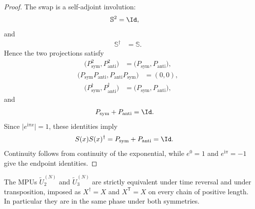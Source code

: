 \begin{proof}
    \leanok
    The swap is a self-adjoint involution:
    \begin{align}
        \mathbb S^2 & = \Id,
    \end{align}
    and
    \begin{align}
        \mathbb S^\dagger & = \mathbb S.
    \end{align}
    Hence the two projections satisfy
    \begin{align}
        \bigl(P_{\mathrm{sym}}^2,P_{\mathrm{anti}}^2\bigr)
         & = \bigl(P_{\mathrm{sym}},P_{\mathrm{anti}}\bigr),
    \end{align}
    \begin{align}
        \bigl(P_{\mathrm{sym}}P_{\mathrm{anti}},
        P_{\mathrm{anti}}P_{\mathrm{sym}}\bigr) & = (0,0),
    \end{align}
    \begin{align}
        \bigl(P_{\mathrm{sym}}^\dagger,P_{\mathrm{anti}}^\dagger\bigr)
         & = \bigl(P_{\mathrm{sym}},P_{\mathrm{anti}}\bigr),
    \end{align}
    and
    \begin{align}
        P_{\mathrm{sym}}+P_{\mathrm{anti}} & = \Id.
    \end{align}
    Since $\lvert e^{\mathrm{i}\pi x}\rvert=1$, these identities imply
    \begin{align}
        S(x)S(x)^\dagger
         & = P_{\mathrm{sym}}+P_{\mathrm{anti}}=\Id.
    \end{align}
    Continuity follows from continuity of the exponential, while $e^0=1$ and
    $e^{\mathrm{i}\pi}=-1$ give the endpoint identities.
\end{proof}

\begin{lemma}
    \label{prop:U2-U3-trivial-tr-transpose}
    \leanok
    The MPUs $\widetilde U_2^{(N)}$ and $\widetilde U_3^{(N)}$ are strictly
    equivalent under time reversal and under transposition, imposed as
    $X^\dagger=X$ and $X^{\mathsf T}=X$ on every chain of positive length.
    In particular they are in the same phase under both symmetries.
\end{lemma}

